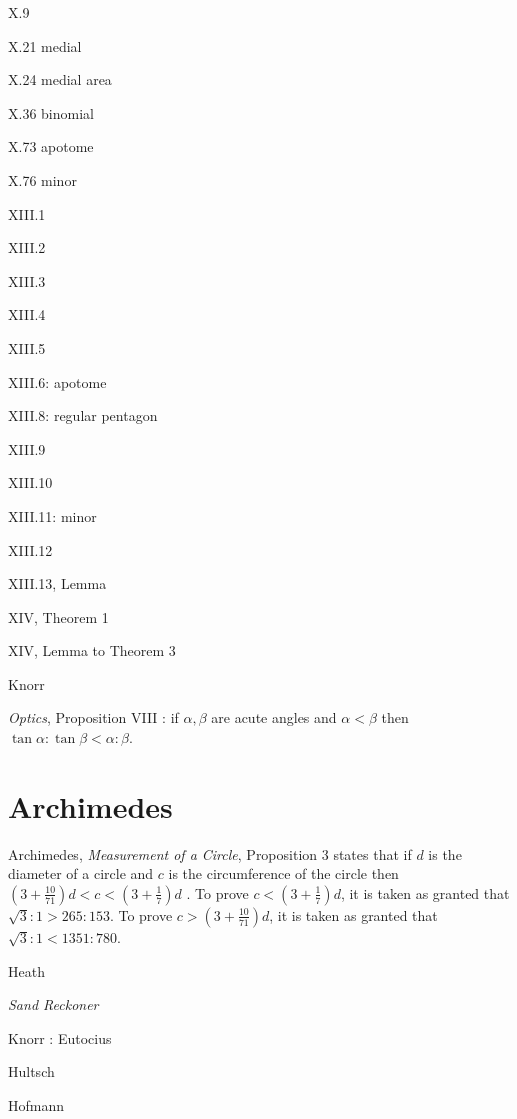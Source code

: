 \documentclass{article}
\theoremstyle{definition}
\begin{document}
X.9

X.21 medial

X.24 medial area

X.36 binomial

X.73 apotome

X.76 minor

XIII.1

XIII.2

XIII.3

XIII.4

XIII.5

XIII.6: apotome

XIII.8: regular pentagon

XIII.9

XIII.10

XIII.11: minor

XIII.12

XIII.13, Lemma 

XIV, Theorem 1

XIV, Lemma to Theorem 3





Knorr \cite{knorr1975}

{\em Optics}, Proposition VIII \cite[pp.~260--261]{drabkin}: if $\alpha,\beta$ are acute angles
and $\alpha<\beta$ then $\tan \alpha:\tan \beta<\alpha:\beta$.









\section{Archimedes}
Archimedes, {\em Measurement of a Circle}, Proposition 3 states that 
if $d$ is the diameter of a circle and $c$ is the circumference of the circle then
$\left(3+\frac{10}{71}\right) d < c < \left(3+\frac{1}{7}\right)d$ \cite[pp.~223--238]{dijksterhuis}.
To prove $c<\left(3+\frac{1}{7}\right)d$, 
it is taken as granted that $\sqrt{3}:1>265:153$.
To prove $c>\left(3+\frac{10}{71}\right)d$, it is taken as granted that
$\sqrt{3}:1<1351:780$. 

Heath \cite{archimedes}

{\em Sand Reckoner}

Knorr \cite[p.~522]{knorr1989}: Eutocius  

Hultsch \cite{naherungswerte}

Hofmann \cite{hofmann}
\end{document}
